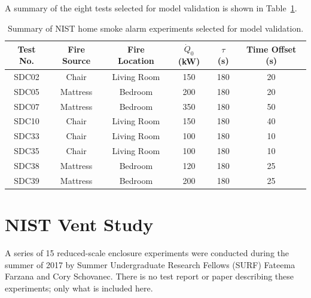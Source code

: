 A summary of the eight tests selected for model validation is shown in Table~\ref{tab:NIST_Dunes_2000_Summary}.

\begin{table}[h!]
\caption{Summary of NIST home smoke alarm experiments selected for model validation.}
\begin{center}
\begin{tabular}{|c|c|c|c|c|c|}
\hline
Test No.  &  Fire Source  &  Fire Location  &  $\dot Q_0$ (kW)  &  $\tau$ (s)  &  Time Offset (s)  \\ \hline \hline
SDC02     &  Chair        &  Living Room    &  150              &  180         &  20               \\ \hline
SDC05     &  Mattress     &  Bedroom        &  200              &  180         &  20               \\ \hline
SDC07     &  Mattress     &  Bedroom        &  350              &  180         &  50               \\ \hline
SDC10     &  Chair        &  Living Room    &  150              &  180         &  40               \\ \hline
SDC33     &  Chair        &  Living Room    &  100              &  180         &  10               \\ \hline
SDC35     &  Chair        &  Living Room    &  100              &  180         &  10               \\ \hline
SDC38     &  Mattress     &  Bedroom        &  120              &  180         &  25               \\ \hline
SDC39     &  Mattress     &  Bedroom        &  200              &  180         &  25               \\ \hline
\end{tabular}
\end{center}
\label{tab:NIST_Dunes_2000_Summary}
\end{table}

\FloatBarrier

\section{NIST Vent Study}

A series of 15 reduced-scale enclosure experiments were conducted during the summer of 2017 by Summer Undergraduate Research Fellows (SURF) Fateema Farzana and Cory Schovanec. There is no test report or paper describing these experiments; only what is included here.

